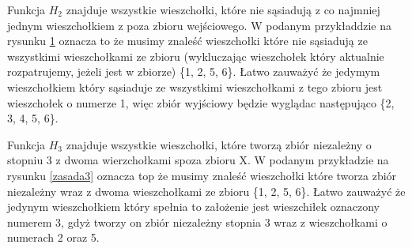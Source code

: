 Funkcja $H_2$ znajduje wszystkie wieszchołki, które nie sąsiadują z co najmniej jednym wieszchołkiem z poza zbioru wejściowego. W podanym przykładdzie na rysunku \ref{zasada2} oznacza to że musimy znaleść wieszchołki które nie sąsiadują ze wszystkimi wieszchołkami ze zbioru (wykluczając wieszchołek który aktualnie rozpatrujemy, jeżeli jest w zbiorze) \{1, 2, 5, 6\}. Łatwo zauważyć że jedymym wieszchołkiem który sąsiaduje ze wszystkimi wieszchołkami z tego zbioru jest wieszchołek o numerze 1, więc zbiór wyjściowy będzie wyglądac następująco \{2, 3, 4, 5, 6\}.

 \begin{figure}[H]
  \centering
    \hspace{15mm}
    \caption{}
 \label{zasada2}
 \end{figure}

Funkcja $H_3$ znajduje wszystkie wieszchołki, które tworzą zbiór niezależny o stopniu 3 z dwoma wierzchołkami spoza zbioru X. W podanym przykładzie na rysunku \ref{zasada3} oznacza top że musimy znaleść wieszchołki które tworza zbiór niezależny wraz z dwoma wieszchołkami ze zbioru \{1, 2, 5, 6\}. Łatwo zauważyć że jedynym wieszchołkiem który spełnia to założenie jest wieszchiłek oznaczony numerem 3, gdyż tworzy on zbiór niezależny stopnia 3 wraz z wieszchołkami o numerach 2 oraz 5.

